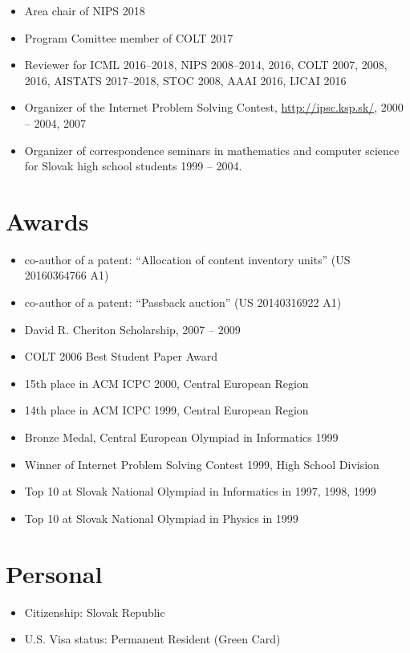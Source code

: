 \documentclass[9pt]{article}
\begin{document}
\begin{itemize}
\item Area chair of NIPS 2018
\item Program Comittee member of COLT 2017
\item Reviewer for ICML 2016--2018, NIPS 2008--2014, 2016, COLT 2007, 2008, 2016, AISTATS 2017--2018, STOC 2008, AAAI 2016, IJCAI 2016
\item Organizer of the Internet Problem Solving Contest, \url{http://ipsc.ksp.sk/}, 2000 -- 2004, 2007
\item Organizer of correspondence seminars in mathematics and computer science for Slovak high school students 1999 -- 2004.
\end{itemize}

\section*{Awards}

\begin{itemize}
\item co-author of a patent: ``Allocation of content inventory units'' (US 20160364766 A1)
\item co-author of a patent: ``Passback auction'' (US 20140316922 A1)
\item David R. Cheriton Scholarship, 2007 -- 2009
\item COLT 2006 Best Student Paper Award
\item 15th place in ACM ICPC 2000, Central European Region
\item 14th place in ACM ICPC 1999, Central European Region
\item Bronze Medal, Central European Olympiad in Informatics 1999
\item Winner of Internet Problem Solving Contest 1999, High School Division
\item Top 10 at Slovak National Olympiad in Informatics in 1997, 1998, 1999
\item Top 10 at Slovak National Olympiad in Physics in 1999
\end{itemize}

\section*{Personal}

\begin{itemize}
\item Citizenship: Slovak Republic
\item U.S. Visa status: Permanent Resident (Green Card)
\end{itemize}
\end{document}
